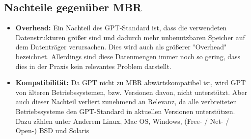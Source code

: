 \subsection{Nachteile gegenüber MBR}
\label{sec:gpt:disadvantages}

\begin{itemize}
    \item \textbf{Overhead:}
    Ein Nachteil des GPT-Standard ist, dass die verwendeten Datenstrukturen größer sind und dadurch mehr unbenutzbaren Speicher auf dem Datenträger verursachen.
    Dies wird auch als größerer "Overhead" bezeichnet.
    Allerdings sind diese Datenmengen immer noch so gering, dass dies in der Praxis kein relevantes Problem darstellt.

    \item \textbf{Kompatibilität:}
    Da GPT nicht zu MBR abwärtskompatibel ist, wird GPT von älteren Betriebssystemen, bzw. Versionen davon, nicht unterstützt.
    Aber auch dieser Nachteil verliert zunehmend an Relevanz, da alle verbreiteten Betriebssysteme den GPT-Standard in aktuellen Versionen unterstützen.
    Dazu zählen unter Anderem Linux, Mac OS, Windows, (Free- / Net- / Open-) BSD und Solaris
\end{itemize}
